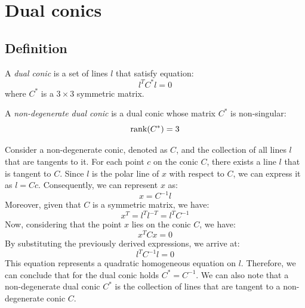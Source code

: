 \section{Dual conics}

\subsection*{Definition}
\begin{definition}
    A \emph{dual conic} is a set of lines $l$ that satisfy equation:
    \[l^TC^{*}l=0\]
    where $C^{*}$ is a $3 \times 3$ symmetric matrix.

    A \emph{non-degenerate dual conic} is a dual conic whose matrix $C^{*}$ is non-singular: 
    \[\textnormal{rank}(C^{*})=3\]
\end{definition}
Consider a non-degenerate conic, denoted as $C$, and the collection of all lines $l$ that are tangents to it.
For each point $c$ on the conic $C$, there exists a line $l$ that is tangent to $C$. 
Since $l$ is the polar line of $x$ with respect to $C$, we can express it as $l=Cc$.
Consequently, we can represent $x$ as:
\[x=C^{-1}l\]
Moreover, given that $C$ is a symmetric matrix, we have:
\[x^T=l^Tl^{-T}=l^TC^{-1}\]
Now, considering that the point $x$ lies on the conic $C$, we have:
\[x^TCx=0\]
By substituting the previously derived expressions, we arrive at:
\[l^TC^{-1}l=0\]
This equation represents a quadratic homogeneous equation on $l$. 
Therefore, we can conclude that for the dual conic holds $C^{*}=C^{-1}$. 
We can also note that a non-degenerate dual conic $C^{*}$ is the collection of lines that are tangent to a non-degenerate conic $C$.

